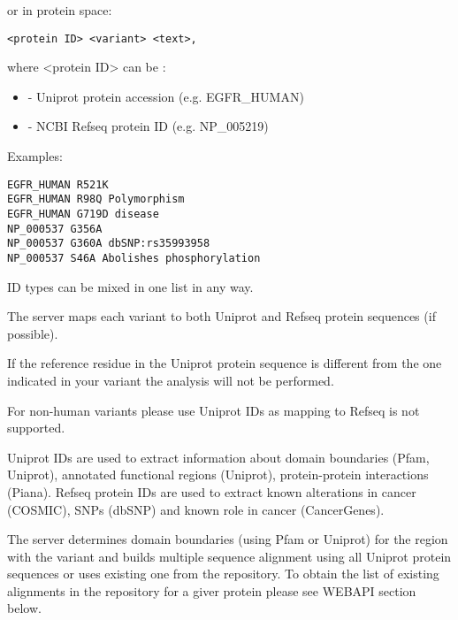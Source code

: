 or in protein space: 

\begin{verbatim}
<protein ID> <variant> <text>, 
\end{verbatim}

where <protein ID> can be : 

\begin{itemize}
	\item - Uniprot protein accession (e.g. EGFR_HUMAN) 
	\item - NCBI Refseq protein ID (e.g. NP_005219) 
\end{itemize}

Examples: 

\begin{verbatim}
EGFR_HUMAN R521K 
EGFR_HUMAN R98Q Polymorphism 
EGFR_HUMAN G719D disease 
NP_000537 G356A 
NP_000537 G360A dbSNP:rs35993958 
NP_000537 S46A Abolishes phosphorylation 
\end{verbatim}

ID types can be mixed in one list in any way. 

The server maps each variant to both Uniprot and Refseq protein sequences (if possible). 

If the reference residue in the Uniprot protein sequence is different from the one indicated in your variant the analysis will not be performed. 

For non-human variants please use Uniprot IDs as mapping to Refseq is not supported. 

Uniprot IDs are used to extract information about domain boundaries (Pfam, Uniprot), annotated functional regions (Uniprot), protein-protein interactions (Piana). Refseq protein IDs are used to extract known alterations in cancer (COSMIC), SNPs (dbSNP) and known role in cancer (CancerGenes). 

The server determines domain boundaries (using Pfam or Uniprot) for the region with the variant and builds multiple sequence alignment using all Uniprot protein sequences or uses existing one from the repository. To obtain the list of existing alignments in the repository for a giver protein please see WEBAPI section below. 

